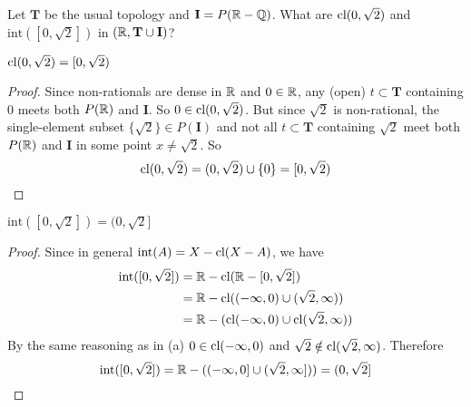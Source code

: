 \setcounter{question}{22} %
\begin{question}[Ewing]
Let $\mathbf{T}$ be the usual topology and $\mathbf{I}=P(\mathbb{R}-\mathbb{Q})$. What are $\text{cl}(0,\sqrt{2})$ and $\text{int}([0,\sqrt{2}])$ in $(\mathbb{R},\mathbf{T}\cup\mathbf{I})$?
\end{question}
$\text{cl}(0,\sqrt{2})=[0,\sqrt{2})$
\begin{proof}
Since non-rationals are dense in $\mathbb{R}$ and $0\in\mathbb{R}$, any (open) $t\subset\mathbf{T}$ containing 0 meets both $P(\mathbb{R})$ and $\mathbf{I}$. So $0\in\text{cl}(0,\sqrt{2})$. But since $\sqrt{2}$ is non-rational, the single-element subset $\{\sqrt{2}\}\in P(\mathbf{I})$ and not all $t\subset\mathbf{T}$ containing $\sqrt{2}$ meet both $P(\mathbb{R})$ and $\mathbf{I}$ in some point $x\ne\sqrt{2}$. So $$\text{cl}(0,\sqrt{2})=(0,\sqrt{2})\cup\{0\}=[0,\sqrt{2})$$
\end{proof}
$\text{int}([0,\sqrt{2}])=(0,\sqrt{2}]$
\begin{proof}
Since in general $\text{int}(A)=X-\text{cl}(X-A)$, we have
\begin{align*}
\text{int}([0,\sqrt{2}]) &= \mathbb{R}-\text{cl}(\mathbb{R}-[0,\sqrt{2}])\\
&= \mathbb{R}-\text{cl}((-\infty,0)\cup(\sqrt{2},\infty))\\
&= \mathbb{R}-(\text{cl}(-\infty,0)\cup\text{cl}(\sqrt{2},\infty))
\end{align*}
By the same reasoning as in (a) $0\in\text{cl}(-\infty,0)$ and $\sqrt{2}\notin\text{cl}(\sqrt{2},\infty)$. Therefore $$\text{int}([0,\sqrt{2}])=\mathbb{R}-((-\infty,0]\cup(\sqrt{2},\infty]))=(0,\sqrt{2}]$$
\end{proof}

